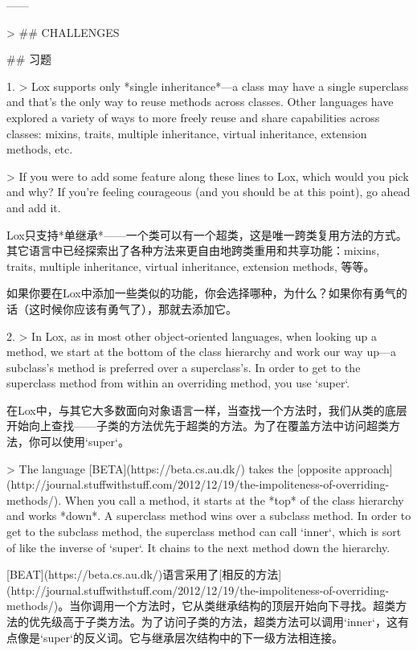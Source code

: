 \documentclass[cn,11pt,chinese]{elegantbook}
\begin{document}
{{{{{{{{{{{{{{{{{{{{{------

> ## CHALLENGES

## 习题

1. > Lox supports only *single inheritance*—a class may have a single superclass and that’s the only way to reuse methods across classes. Other languages have explored a variety of ways to more freely reuse and share capabilities across classes: mixins, traits, multiple inheritance, virtual inheritance, extension methods, etc.

   > If you were to add some feature along these lines to Lox, which would you pick and why? If you’re feeling courageous (and you should be at this point), go ahead and add it.

   Lox只支持*单继承*——一个类可以有一个超类，这是唯一跨类复用方法的方式。其它语言中已经探索出了各种方法来更自由地跨类重用和共享功能：mixins, traits, multiple inheritance, virtual inheritance, extension methods, 等等。

   如果你要在Lox中添加一些类似的功能，你会选择哪种，为什么？如果你有勇气的话（这时候你应该有勇气了），那就去添加它。

2. > In Lox, as in most other object-oriented languages, when looking up a method, we start at the bottom of the class hierarchy and work our way up—a subclass’s method is preferred over a superclass’s. In order to get to the superclass method from within an overriding method, you use `super`.

   在Lox中，与其它大多数面向对象语言一样，当查找一个方法时，我们从类的底层开始向上查找——子类的方法优先于超类的方法。为了在覆盖方法中访问超类方法，你可以使用`super`。

   > The language [BETA](https://beta.cs.au.dk/) takes the [opposite approach](http://journal.stuffwithstuff.com/2012/12/19/the-impoliteness-of-overriding-methods/). When you call a method, it starts at the *top* of the class hierarchy and works *down*. A superclass method wins over a subclass method. In order to get to the subclass method, the superclass method can call `inner`, which is sort of like the inverse of `super`. It chains to the next method down the hierarchy.

   [BEAT](https://beta.cs.au.dk/)语言采用了[相反的方法](http://journal.stuffwithstuff.com/2012/12/19/the-impoliteness-of-overriding-methods/)。当你调用一个方法时，它从类继承结构的顶层开始向下寻找。超类方法的优先级高于子类方法。为了访问子类的方法，超类方法可以调用`inner`，这有点像是`super`的反义词。它与继承层次结构中的下一级方法相连接。

}}}}}}}}}}}}}}}}}}}}}
\end{document}
